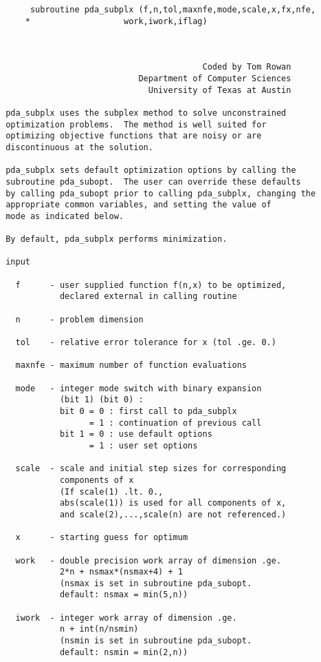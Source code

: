 \begin{verbatim}
      subroutine pda_subplx (f,n,tol,maxnfe,mode,scale,x,fx,nfe,
     *                   work,iwork,iflag)



                                         Coded by Tom Rowan
                            Department of Computer Sciences
                              University of Texas at Austin

 pda_subplx uses the subplex method to solve unconstrained
 optimization problems.  The method is well suited for
 optimizing objective functions that are noisy or are
 discontinuous at the solution.

 pda_subplx sets default optimization options by calling the
 subroutine pda_subopt.  The user can override these defaults
 by calling pda_subopt prior to calling pda_subplx, changing the
 appropriate common variables, and setting the value of
 mode as indicated below.

 By default, pda_subplx performs minimization.

 input

   f      - user supplied function f(n,x) to be optimized,
            declared external in calling routine

   n      - problem dimension

   tol    - relative error tolerance for x (tol .ge. 0.)

   maxnfe - maximum number of function evaluations

   mode   - integer mode switch with binary expansion
            (bit 1) (bit 0) :
            bit 0 = 0 : first call to pda_subplx
                  = 1 : continuation of previous call
            bit 1 = 0 : use default options
                  = 1 : user set options

   scale  - scale and initial step sizes for corresponding
            components of x
            (If scale(1) .lt. 0.,
            abs(scale(1)) is used for all components of x,
            and scale(2),...,scale(n) are not referenced.)

   x      - starting guess for optimum

   work   - double precision work array of dimension .ge.
            2*n + nsmax*(nsmax+4) + 1
            (nsmax is set in subroutine pda_subopt.
            default: nsmax = min(5,n))

   iwork  - integer work array of dimension .ge.
            n + int(n/nsmin)
            (nsmin is set in subroutine pda_subopt.
            default: nsmin = min(2,n))


\end{verbatim}
